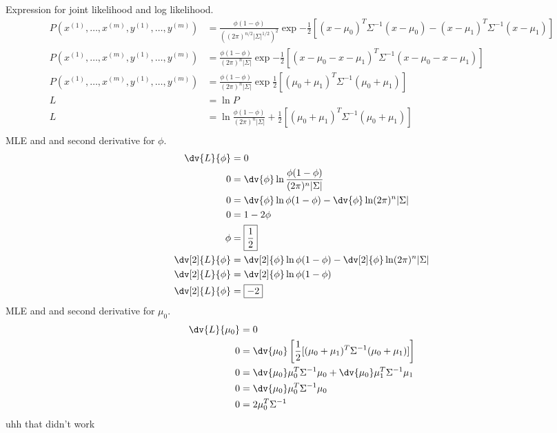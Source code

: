 \documentclass[newpage]{homework}
\begin{document}
\question
Expression for joint likelihood and log likelihood.
\begin{align*}
    P(x^{(1)},\dots,x^{(m)},y^{(1)},\dots,y^{(m)})	&= \frac{\phi(1-\phi)}{((2\pi)^{n/2} |\Sigma|^{1/2})^2} \exp{-\frac{1}{2} [(x-\mu_0)^T \Sigma^{-1} (x-\mu_0) - (x-\mu_1)^T \Sigma^{-1} (x-\mu_1)]}	\\
    P(x^{(1)},\dots,x^{(m)},y^{(1)},\dots,y^{(m)})	&= \frac{\phi(1-\phi)}{(2\pi)^n |\Sigma|} \exp{-\frac{1}{2} [(x-\mu_0 - x - \mu_1)^T \Sigma^{-1} (x-\mu_0 - x - \mu_1)]}	\\
    P(x^{(1)},\dots,x^{(m)},y^{(1)},\dots,y^{(m)})	&= \boxed{\frac{\phi(1-\phi)}{(2\pi)^n |\Sigma|} \exp{\frac{1}{2} [(\mu_0 + \mu_1)^T \Sigma^{-1} (\mu_0 + \mu_1)]}}	\\
    L   &=  \ln P   \\
    L   &=	\boxed{\ln \frac{\phi(1-\phi)}{(2\pi)^n |\Sigma|} + \frac{1}{2} [(\mu_0 + \mu_1)^T \Sigma^{-1} (\mu_0 + \mu_1)]}	\\
\end{align*}
MLE and and second derivative for $\phi$.
\begin{align*}
    \dv{L}{\phi}	&=	0   \\
    0   &=  \dv{\phi} \ln \frac{\phi(1-\phi)}{(2\pi)^n |\Sigma|} 	\\
    0	&=	\dv{\phi} \ln \phi(1-\phi) -  \dv{\phi} \ln (2\pi)^n |\Sigma| 	\\
    0	&=	1-2\phi	\\
    \phi    &=  \boxed{\frac{1}{2}} \\
    \dv[2]{L}{\phi} &=  \dv[2]{\phi} \ln \phi(1-\phi) -  \dv[2]{\phi} \ln (2\pi)^n |\Sigma| \\
    \dv[2]{L}{\phi} &=  \dv[2]{\phi} \ln \phi(1-\phi)   \\
    \dv[2]{L}{\phi} &=  \boxed{-2}  \\
\end{align*}
MLE and and second derivative for $\mu_0$.
\begin{align*}
    \dv{L}{\mu_0}	&=	0   \\
	0   &=	\dv{\mu_0} \left[\frac{1}{2} [(\mu_0 + \mu_1)^T \Sigma^{-1} (\mu_0 + \mu_1)] \right]	\\
	0   &=	\dv{\mu_0} \mu_0^T \Sigma^{-1} \mu_0 + \dv{\mu_0} \mu_1^T \Sigma^{-1} \mu_1	\\
	0   &=	\dv{\mu_0} \mu_0^T \Sigma^{-1} \mu_0	\\
	0   &=	2\mu_0^T \Sigma^{-1}
\end{align*}
uhh that didn't work
\end{document}
